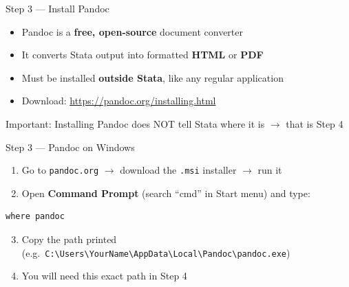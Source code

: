\documentclass[dvipsnames,hyperref={pdfpagelabels=false}]{beamer}
\begin{document}
\begin{frame}{Step 3 --- Install Pandoc}
  \begin{itemize}
    \item Pandoc is a \textbf{free, open-source} document converter
    \item It converts Stata output into formatted \textbf{HTML} or \textbf{PDF}
    \item Must be installed \textbf{outside Stata}, like any regular application
    \item Download: \url{https://pandoc.org/installing.html}
  \end{itemize}

  \vspace{1em}
  \alert{Important}: Installing Pandoc does NOT tell Stata where it is $\to$ that is Step 4
\end{frame}

\begin{frame}[fragile]{Step 3 --- Pandoc on Windows}
  \begin{enumerate}
    \item Go to \texttt{pandoc.org} $\to$ download the \texttt{.msi} installer $\to$ run it
    \item Open \textbf{Command Prompt} (search ``cmd'' in Start menu) and type:
  \end{enumerate}

  \begin{lstlisting}[language={},backgroundcolor=\color{gray!6}]
where pandoc
  \end{lstlisting}

  \begin{enumerate}
    \setcounter{enumi}{2}
    \item Copy the path printed (e.g.\
          \texttt{C:\textbackslash Users\textbackslash YourName\textbackslash AppData\textbackslash Local\textbackslash Pandoc\textbackslash pandoc.exe})
    \item You will need this exact path in Step 4
  \end{enumerate}
\end{frame}
\end{document}
